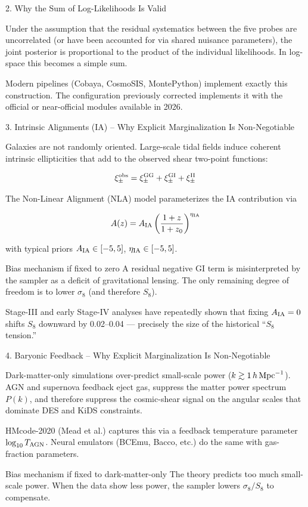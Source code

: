 2. Why the Sum of Log-Likelihoods Is Valid

Under the assumption that the residual systematics between the five probes are uncorrelated (or have been accounted for via shared nuisance parameters), the joint posterior is proportional to the product of the individual likelihoods. In log-space this becomes a simple sum.  

Modern pipelines (Cobaya, CosmoSIS, MontePython) implement exactly this construction. The configuration previously corrected implements it with the official or near-official modules available in 2026.

3. Intrinsic Alignments (IA) – Why Explicit Marginalization Is Non-Negotiable

Galaxies are not randomly oriented. Large-scale tidal fields induce coherent intrinsic ellipticities that add to the observed shear two-point functions:

\[
\xi_{\pm}^{\rm obs} = \xi_{\pm}^{\rm GG} + \xi_{\pm}^{\rm GI} + \xi_{\pm}^{\rm II}
\]

The Non-Linear Alignment (NLA) model parameterizes the IA contribution via

\[
A(z) = A_{\rm IA}\left(\frac{1+z}{1+z_0}\right)^{\eta_{\rm IA}}
\]

with typical priors \(A_{\rm IA}\in[-5,5]\), \(\eta_{\rm IA}\in[-5,5]\).

Bias mechanism if fixed to zero  
A residual negative GI term is misinterpreted by the sampler as a deficit of gravitational lensing. The only remaining degree of freedom is to lower \(\sigma_8\) (and therefore \(S_8\)).  

Stage-III and early Stage-IV analyses have repeatedly shown that fixing \(A_{\rm IA}=0\) shifts \(S_8\) downward by 0.02–0.04 — precisely the size of the historical “\(S_8\) tension.”

4. Baryonic Feedback – Why Explicit Marginalization Is Non-Negotiable

Dark-matter-only simulations over-predict small-scale power (\(k\gtrsim 1\,h\,{\rm Mpc}^{-1}\)). AGN and supernova feedback eject gas, suppress the matter power spectrum \(P(k)\), and therefore suppress the cosmic-shear signal on the angular scales that dominate DES and KiDS constraints.

HMcode-2020 (Mead et al.) captures this via a feedback temperature parameter \(\log_{10}T_{\rm AGN}\). Neural emulators (BCEmu, Bacco, etc.) do the same with gas-fraction parameters.

Bias mechanism if fixed to dark-matter-only  
The theory predicts too much small-scale power. When the data show less power, the sampler lowers \(\sigma_8/S_8\) to compensate.  


